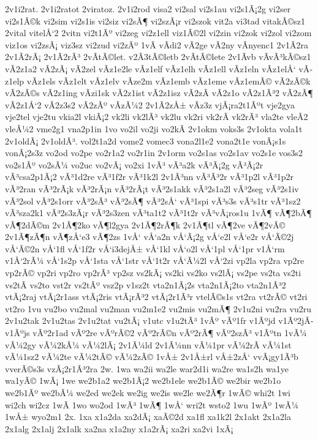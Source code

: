 {2v1i2rat.
2v1i2ratot
2viratoz.
2v1i2rod
visa2
vi2sal
vi2s1au
vi2s1Ã¡2g
vi2ser
vi2s1Ã©k
vi2sim
vi2s1is
vi2siz
vi2sÃ¶
vi2szÃ¡r
vi2szok
vit2a
vi3tad
vitakÃ©sz1
2vital
vitelÅ‘2
2vitn
vi2t1Ãº
vi2zeg
vi2z1ell
viz1Ã©2l
vi2zin
vi2zok
vi2zol
vi2zom
viz1os
vi2zsÃ¡
viz3sz
vi2zud
vi2zÃº
1vÃ­
vÃ­di2
vÃ­2ge
vÃ­2ny
vÃ­nyenc1
2v1Ã­2ra
2v1Ã­2rÃ¡
2v1Ã­2rÃ³
2vÃ­tÃ©let.
v2Ã­3tÃ©letb
2vÃ­tÃ©lete
2v1Ã­vb
vÃ­vÃ³kÃ©sz1
vÃ­2z1a2
vÃ­2zÃ¡
vÃ­2zel
vÃ­z1e2le
vÃ­z1elf
vÃ­z1elh
vÃ­z1ell
vÃ­z1eln
vÃ­z1elÅ‘
vÃ­z1elp
vÃ­z1els
vÃ­z1elt
vÃ­z1elv
vÃ­ze2m
vÃ­z1emb
vÃ­z1eme
vÃ­z1emÃ©
vÃ­2zÃ©k
vÃ­2zÃ©s
vÃ­2z1ing
vÃ­zi1sk
vÃ­2z1ist
vÃ­2z1isz
vÃ­2zÃ­
vÃ­2z1o
vÃ­2z1Ã³2
vÃ­2zÃ¶
vÃ­2z1Å‘2
vÃ­2z3s2
vÃ­2zÃº
vÃ­zÃ¼2
2v1Ã­2zÅ±
vÃ­z3z
vjÃ¡ra2t1Ãºt
vje2gya
vje2tel
vje2tu
vkia2l
vkiÃ¡2
vk2li
vk2lÃ³
vk2lu
vk2ri
vk2rÃ­
vk2rÃ³
vla2te
vleÃ­2
vleÃ¼2
vme2g1
vna2p1in
1vo
vo2il
vo2ji
vo2kÃ­
2v1okm
voks3s
2v1okta
vola1t
2v1oldÃ¡
2v1oldÃ³.
vol2t1a2d
vome2
vomec3
vona2l1e2
vona2t1e
vonÃ¡s1s
vonÃ¡2s3z
vo2od
vo2pe
vo2r1a2
vo2r1in
2v1orm
vo2s1as
vo2s1av
vo2s1e
vos3s2
vo2s1Ãº
vo2sÃ¼
vo2uc
vo2vÃ¡
vo2xi
1vÃ³
vÃ³a2k
vÃ³Ã¡2g
vÃ³Ã¡2r
vÃ³csa2p1Ã¡2
vÃ³1d2re
vÃ³1f2r
vÃ³1k2l
2v1Ã³nn
vÃ³Ã³2r
vÃ³1p2l
vÃ³1p2r
vÃ³2ran
vÃ³2rÃ¡k
vÃ³2rÃ¡n
vÃ³2rÃ¡t
vÃ³2s1akk
vÃ³2s1a2l
vÃ³2seg
vÃ³2s1iv
vÃ³2sol
vÃ³2s1orr
vÃ³2sÃ³
vÃ³2sÃ¶
vÃ³2sÅ‘
vÃ³1spi
vÃ³s3s
vÃ³s1tr
vÃ³1sz2
vÃ³sza2k1
vÃ³2s3zÃ¡r
vÃ³2s3zen
vÃ³ta1t2
vÃ³1t2r
vÃ³vÃ¡ros1u
1vÃ¶
vÃ¶2bÃ¶
vÃ¶2dÃ©m
2v1Ã¶2ko
vÃ¶l2gya
2v1Ã¶2rÃ¶k
2v1Ã¶tl
vÃ¶2ve
vÃ¶2vÃ©
2v1Ã¶zÃ¶n
vÃ¶zÅ‘e3
vÃ¶2zs
1vÅ‘
vÅ‘a2n
vÅ‘Ã¡2g
vÅ‘e2l
vÅ‘e2r
vÅ‘Ã©2j
vÅ‘Ã©2n
vÅ‘1fl
vÅ‘1f2r
vÅ‘i3dejÅ±
vÅ‘1kl
vÅ‘o2l
vÅ‘1pl
vÅ‘1pr
v1Å‘rm
v1Å‘2rÃ¼
vÅ‘1s2p
vÅ‘1sta
vÅ‘1str
vÅ‘1t2r
vÅ‘Ã¼2l
vÅ‘2zi
vp2la
vp2ra
vp2re
vp2rÃ©
vp2ri
vp2ro
vp2rÃ³
vp2sz
vs2kÃ¡
vs2ki
vs2ko
vs2lÃ¡
vs2pe
vs2ta
vs2ti
vs2tÃ­
vs2to
vst2r
vs2tÃº
vsz2p
v1sz2t
vta2n1Ã¡2s
vta2n1Ã¡2to
vta2n1Ã³2
vtÃ¡2raj
vtÃ¡2r1ass
vtÃ¡2ris
vtÃ¡rÃ³2
vtÃ¡2r1Ã³r
vtelÃ©s1s
vt2ra
vt2rÃ©
vt2ri
vt2ro
1vu
vu2bo
vu2mal
vu2man
vu2m1e2
vu2mis
vu2mÃ¶
2v1u2ni
vu2ra
vu2ru
2v1u2tak
2v1u2tas
2v1u2tat
vu2tÃ¡
v1utc
v1u2tÃ³
1vÃº
vÃº1fr
v1Ãºjd
v1Ãº2jÃ­
v1Ãºjs
vÃº2r1ad
vÃº2re
vÃºrÃ©2
vÃº2rÃ©n
vÃº2rÃ¶
vÃº2szÃ³
v1Ãºtn
1vÃ¼
vÃ¼2gy
vÃ¼2kÃ¼
vÃ¼2lÃ¡
2v1Ã¼ld
2v1Ã¼nn
vÃ¼1pr
vÃ¼2rÃ­
vÃ¼1st
vÃ¼1sz2
vÃ¼2te
vÃ¼2tÃ©
vÃ¼2zÃ©
1vÅ±
2v1Å±rl
vÅ±2zÅ‘
vvÃ¡gy1Ã³b
vverÃ©s3s
vzÃ¡2r1Ã³2ra
2w.
1wa
wa2ii
wa2le
war2d1i
wa2re
wa1s2h
wa1ye
wa1yÃ©
1wÃ¡
1we
we2b1a2
we2b1Ã¡2
we2b1ele
we2b1Ã©
we2bir
we2b1o
we2b1Ãº
we2bÃ¼
we2ed
we2ek
we2ig
we2is
we2le
we2Ã¶r
1wÃ©
whi2t
1wi
wi2ch
wi2cz
1wÃ­
1wo
wo2od
1wÃ³
1wÃ¶
1wÅ‘
wri2t
wsto2
1wu
1wÃº
1wÃ¼
1wÅ±
wyo2m1
2x.
1xa
x1a2da
xa2dÃ¡
xaÃ©2d
xa1fl
xa1k2l
2x1akt
2x1a2la
2x1alg
2x1alj
2x1alk
xa2na
x1a2ny
x1a2rÃ¡
xa2ri
xa2vi
1xÃ¡
}
